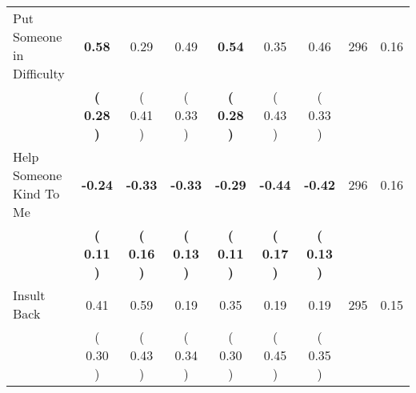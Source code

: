 \begin{tabular}{lcccccccc}
Put Someone in Difficulty & \textbf{     0.58} &      0.29 &      0.49 & \textbf{     0.54} &      0.35 &      0.46 & 296 &       0.16 \\ 
 & \textbf{(     0.28 )} & (     0.41 ) & (     0.33 ) & \textbf{(     0.28 )} & (     0.43 ) & (     0.33 ) & \\
Help Someone Kind To Me & \textbf{    -0.24} & \textbf{    -0.33} & \textbf{    -0.33} & \textbf{    -0.29} & \textbf{    -0.44} & \textbf{    -0.42} & 296 &       0.16 \\ 
 & \textbf{(     0.11 )} & \textbf{(     0.16 )} & \textbf{(     0.13 )} & \textbf{(     0.11 )} & \textbf{(     0.17 )} & \textbf{(     0.13 )} & \\
Insult Back &      0.41 &      0.59 &      0.19 &      0.35 &      0.19 &      0.19 & 295 &       0.15 \\ 
 & (     0.30 ) & (     0.43 ) & (     0.34 ) & (     0.30 ) & (     0.45 ) & (     0.35 ) & \\
\bottomrule
\end{tabular}
